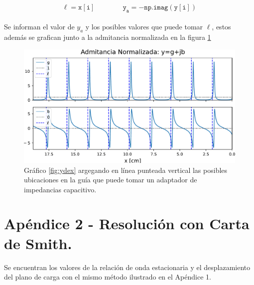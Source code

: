 \documentclass[11pt,a4paper]{article}
\begin{document}
\begin{appendices}
\begin{multicols}{2}
    \begin{equation}
        \mathtt{\ell = x[i]\qquad\qquad y_a = - np.imag(y[i])}
    \end{equation}\\[-1em]

    Se informan el valor de $y_a$ y los posibles valores que puede tomar $\ell$, estos además se grafican junto a la admitancia normalizada en la figura \ref{fig:ydex_l}\\

    \begin{figure}[H]
        \centering
        \includegraphics[width=\linewidth]{Images/ydex_l.pdf}
        \caption{Gráfico \ref{fig:ydex} argegando en línea punteada vertical las posibles ubicaciones en la guía que puede tomar un adaptador de impedancias capacitivo.}
        \label{fig:ydex_l}
    \end{figure}

\end{multicols}
\pagebreak
\section{Apéndice 2 - Resolución con Carta de Smith.}
\begin{multicols}{2}
    Se encuentran los valores de la relación de onda estacionaria y el desplazamiento del plano de carga con el mismo método ilustrado en el Apéndice 1.\\
    

\end{multicols}
\end{appendices}
\end{document}
